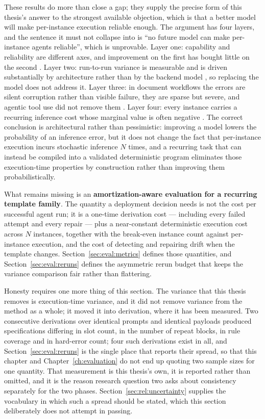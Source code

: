 These results do more than close a gap; they supply the precise form of this thesis's answer to
the strongest available objection, which is that a better model will make per-instance
execution reliable enough. The argument has four layers, and the sentence it must not collapse
into is ``no future model can make per-instance agents reliable'', which is unprovable. Layer
one: capability and reliability are different axes, and improvement on the first has bought
little on the second \cite{rabanser2026reliability}. Layer two: run-to-run variance is
measurable and is driven substantially by architecture rather than by the backend model
\cite{yao2025taubench,ma2026maestro}, so replacing the model does not address it. Layer three:
in document workflows the errors are silent corruption rather than visible failure, they are
sparse but severe, and agentic tool use did not remove them \cite{laban2026delegate}. Layer
four: every instance carries a recurring inference cost whose marginal value is often negative
\cite{erol2025costofpass,kim2026dynamicreasoning}. The correct conclusion is architectural
rather than pessimistic: improving a model lowers the probability of an inference error, but it
does not change the fact that per-instance execution incurs stochastic inference $N$ times, and
a recurring task that can instead be compiled into a validated deterministic program eliminates
those execution-time properties by construction rather than improving them probabilistically.

What remains missing is an \textbf{amortization-aware evaluation for a recurring template
family}. The quantity a deployment decision needs is not the cost per successful agent run; it
is a one-time derivation cost --- including every failed attempt and every repair --- plus a
near-constant deterministic execution cost across $N$ instances, together with the break-even
instance count against per-instance execution, and the cost of detecting and repairing drift
when the template changes. Section~\ref{sec:eval:metrics} defines those quantities, and
Section~\ref{sec:eval:reruns} defines the asymmetric rerun budget that keeps the variance
comparison fair rather than flattering.

Honesty requires one more thing of this section. The variance that this thesis removes is
execution-time variance, and it did not remove variance from the method as a whole; it moved it
into derivation, where it has been measured. Two consecutive derivations over identical prompts
and identical payloads produced specifications differing in slot count, in the number of
repeat blocks, in rule coverage and in hard-error count; four such derivations exist in all,
and Section~\ref{sec:eval:reruns} is the single place that reports their spread, so that this
chapter and Chapter~\ref{ch:evaluation} do not end up quoting two sample sizes for one
quantity. That measurement is this thesis's own,
it is reported rather than omitted, and it is the reason research question two asks about
consistency separately for the two phases. Section~\ref{sec:rel:uncertainty} supplies the
vocabulary in which such a spread should be stated, which this section deliberately does not
attempt in passing.

